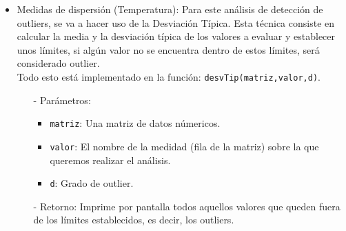 \documentclass[a4paper, 12pt]{article}
\begin{document}
\begin{itemize}
			\item Medidas de dispersión (Temperatura): Para este análisis de detección de outliers, se va a hacer uso de la Desviación Típica. Esta técnica consiste en calcular la media y la desviación típica de los valores a evaluar y establecer unos límites, si algún valor no se encuentra dentro de estos límites, será considerado outlier. \\
			Todo esto está implementado en la función: \texttt{desvTip(matriz,valor,d)}.
			\begin{itemize}
				\item[-] Parámetros:
				\begin{itemize}
					\item \texttt{matriz}: Una matriz de datos númericos.
					\item \texttt{valor}: El nombre de la medidad (fila de la matriz) sobre la que queremos realizar el análisis.
					\item \texttt{d}: Grado de outlier.
				\end{itemize}
				
				\item[-] Retorno: Imprime por pantalla todos aquellos valores que queden fuera de los límites establecidos, es decir, los outliers.
				

\end{itemize}
\end{itemize}
\end{document}
